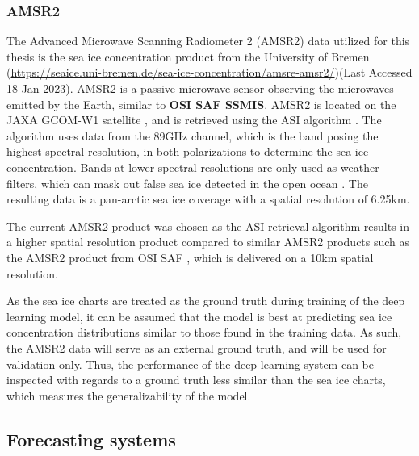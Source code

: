 \documentclass[../main/thesis.tex]{subfiles}
\begin{document}
\subsubsection{AMSR2}
The Advanced Microwave Scanning Radiometer 2 (AMSR2) data utilized for this thesis is the sea ice concentration product from the University of Bremen (\url{https://seaice.uni-bremen.de/sea-ice-concentration/amsre-amsr2/})(Last Accessed 18 Jan 2023). AMSR2 is a passive microwave sensor observing the microwaves emitted by the Earth, similar to \textbf{OSI SAF SSMIS}. AMSR2 is located on the JAXA GCOM-W1 satellite \cite{Melsheimer2019}, and is retrieved using the ASI algorithm \cite{Spreen2008}. The algorithm uses data from the 89GHz channel, which is the band posing the highest spectral resolution, in both polarizations to determine the sea ice concentration. Bands at lower spectral resolutions are only used as weather filters, which can mask out false sea ice detected in the open ocean \cite{Spreen2008}. The resulting data is a pan-arctic sea ice coverage with a spatial resolution of 6.25km.

The current AMSR2 product was chosen as the ASI retrieval algorithm \citep{Spreen2008} results in a higher spatial resolution product compared to similar AMSR2 products such as the AMSR2 product from OSI SAF \citep{Lavelle2016}, which is delivered on a 10km spatial resolution.

As the sea ice charts are treated as the ground truth during training of the deep learning model, it can be assumed that the model is best at predicting sea ice concentration distributions similar to those found in the training data. As such, the AMSR2 data will serve as an external ground truth, and will be used for validation only. Thus, the performance of the deep learning system can be inspected with regards to a ground truth less similar than the sea ice charts, which measures the generalizability of the model. 

\subsection{Forecasting systems} 
\end{document}
